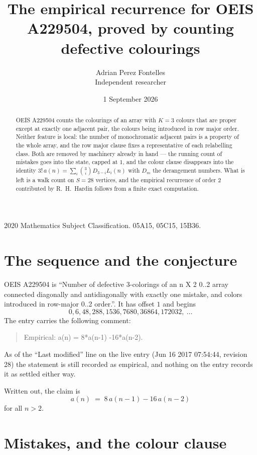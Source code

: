 \documentclass[11pt,a4paper]{article}
\title{The empirical recurrence for OEIS A229504, proved by counting defective colourings}
\author{Adrian Perez Fontelles\\ \small Independent researcher}
\date{1 September 2026}
\theoremstyle{plain}
\theoremstyle{definition}
\begin{document}
\maketitle

\begin{abstract}
OEIS A229504 counts the colourings of an array with $K=3$ colours that are proper except at
exactly one adjacent pair, the colours being introduced in row
major order. Neither feature is local: the number of monochromatic adjacent pairs is a
property of the whole array, and the row major clause fixes a representative of each
relabelling class. Both are removed by machinery already in hand --- the running count of
mistakes goes into the state, capped at $1$, and the colour clause disappears into the
identity $3!\,a(n)=\sum_i\binom{3}{i}D_{3-i}L_i(n)$ with $D_m$ the derangement
numbers. What is left is a walk count on $S=28$ vertices, and the empirical recurrence of
order $2$ contributed by R.~H.~Hardin follows from a finite exact computation.
\end{abstract}

\noindent\small 2020 Mathematics Subject Classification. 05A15, 05C15, 15B36.\normalsize

\section{The sequence and the conjecture}

OEIS A229504 is ``Number of defective 3-colorings of an n X 2 0..2 array connected diagonally and antidiagonally with exactly one mistake, and colors introduced in row-major 0..2 order.''. It has offset $1$ and begins
\[
0, 6, 48, 288, 1536, 7680, 36864, 172032,\ \dots
\]
The entry carries the following comment:
\begin{quote}\small
Empirical: a(n) = 8*a(n-1) -16*a(n-2).
\end{quote}
As of the ``Last modified'' line on the live entry (Jun 16 2017 07:54:44, revision 28) the statement is
still recorded as empirical, and nothing on the entry records it as settled either way.

Written out, the claim is
\begin{equation}\label{eq:conj}
a(n)\;=\;8\,a(n-1) - 16\,a(n-2)
\end{equation}
for all $n>2$.

\section{Mistakes, and the colour clause}
\end{document}
